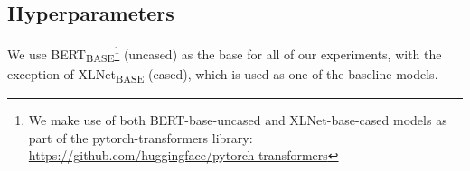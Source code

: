 \documentclass[11pt,a4paper]{article}
\newcommand{\rood}[1]{}
\begin{document}
\begin{table}[h!]
  \begin{center}
  \end{center}

  \caption{Top: Detailed statistics of the corpora for BERT language model finetuning. Bottom: Number of labels for each category of the SemEval 2014 Task 4 Subtask 2 laptop and restaurant datasets for Aspect-Target Sentiment Classification.
  }\label{tab:datasets}
\end{table}

\subsection{Hyperparameters}
\rood{Outcome: Based on the description of the hyperparamters readers should be able to reproduce our results}

We use BERT\textsubscript{BASE}\footnote{We make use of both BERT-base-uncased and XLNet-base-cased models as part of the pytorch-transformers library:  \url{https://github.com/huggingface/pytorch-transformers}} (uncased) as the base for all of our experiments, with the exception of XLNet\textsubscript{BASE} (cased), which is used as one of the baseline models.
\end{document}
